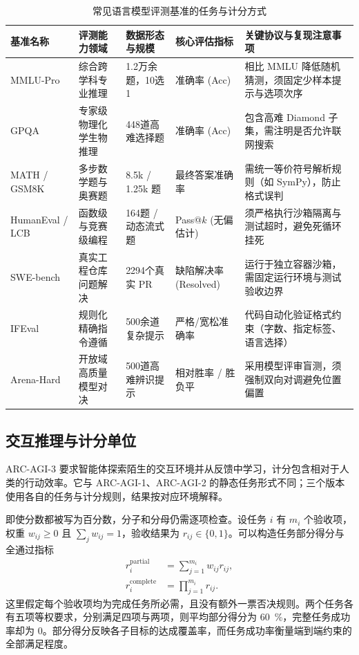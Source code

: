 \documentclass[../textbook.tex]{subfiles}
\begin{document}
\begin{table}[htbp]
\centering
\caption{常见语言模型评测基准的任务与计分方式}\label{tab:academic-benchmarks}
\begin{tabularx}{\linewidth}{p{22mm}p{22mm}p{22mm}p{20mm}X}
\toprule
基准名称 & 评测能力领域 & 数据形态与规模 & 核心评估指标 & 关键协议与复现注意事项 \\\midrule
MMLU-Pro & 综合跨学科专业推理 & 1.2万余题，10选1 & 准确率 (Acc) & 相比 MMLU 降低随机猜测，须固定少样本提示与选项次序 \\
GPQA & 专家级物理化学生物推理 & 448道高难选择题 & 准确率 (Acc) & 包含高难 Diamond 子集，需注明是否允许联网搜索 \\
MATH / GSM8K & 多步数学题与奥赛题 & 8.5k / 1.25k 题 & 最终答案准确率 & 需统一等价符号解析规则（如 SymPy），防止格式误判 \\
HumanEval / LCB & 函数级与竞赛级编程 & 164题 / 动态流式题 & Pass@$k$ (无偏估计) & 须严格执行沙箱隔离与测试超时，避免死循环挂死 \\
SWE-bench & 真实工程仓库问题解决 & 2294个真实 PR & 缺陷解决率 (Resolved) & 运行于独立容器沙箱，需固定运行环境与测试验收边界 \\
IFEval & 规则化精确指令遵循 & 500余道复杂提示 & 严格/宽松准确率 & 代码自动化验证格式约束（字数、指定标签、语言选择） \\
Arena-Hard & 开放域高质量模型对决 & 500道高难辨识提示 & 相对胜率 / 胜负平 & 采用模型评审盲测，须强制双向对调避免位置偏置 \\
\bottomrule
\end{tabularx}
\end{table}

\subsection{交互推理与计分单位}
ARC-AGI-3 要求智能体探索陌生的交互环境并从反馈中学习，计分包含相对于人类的行动效率。它与 ARC-AGI-1、ARC-AGI-2 的静态任务形式不同；三个版本使用各自的任务与计分规则，结果按对应环境解释\cite{arc2026agi3}。

即使分数都被写为百分数，分子和分母仍需逐项检查。设任务 $i$ 有 $m_i$ 个验收项，权重 $w_{ij}\geq0$ 且 $\sum_jw_{ij}=1$，验收结果为 $r_{ij}\in\{0,1\}$。可以构造任务部分得分与全通过指标
\begin{equation}\label{eq:eval-partial-complete}
 \begin{aligned}
  r_i^{\mathrm{partial}} &= \sum_{j=1}^{m_i}w_{ij}r_{ij}, \\
  r_i^{\mathrm{complete}} &= \prod_{j=1}^{m_i}r_{ij}.
 \end{aligned}
\end{equation}
这里假定每个验收项均为完成任务所必需，且没有额外一票否决规则。两个任务各有五项等权要求，分别满足四项与两项，则平均部分得分为 \qty{60}{\percent}，完整任务成功率却为 0。部分得分反映各子目标的达成覆盖率，而任务成功率衡量端到端约束的全部满足程度。
\end{document}
